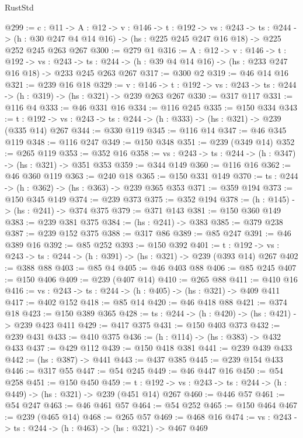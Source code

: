 \begin{lexlean}{RustStd}
\begin{coremodule}
{\begin{coremodule}
@299 := {c : @11} ->
  {A : @12} ->
  {v : @146} ->
  {t : @192} ->
  {vs : @243} ->
  {ts : @244} ->
  (h : @30 @247 @4 @14 @16) -> (hs : @225 @245 @247 @16 @18) -> @225 @252 @245 @263 @267
@300 := @279 @1
@316 := {A : @12} ->
  {v : @146} ->
  {t : @192} ->
  {vs : @243} ->
  {ts : @244} -> (h : @39 @4 @14 @16) -> (hs : @233 @247 @16 @18) -> @233 @245 @263 @267
@317 := @300 @2
@319 := @46 @14 @16
@321 := @239 @16 @18
@329 := {v : @146} ->
  {t : @192} -> {vs : @243} -> {ts : @244} -> (h : @319) -> (hs : @321) -> @239 @263 @267
@330 := @317 @117
@331 := @116 @4
@333 := @46 @331 @16
@334 := @116 @245
@335 := @150 @334
@343 := {t : @192} ->
  {vs : @243} -> {ts : @244} -> (h : @333) -> (hs : @321) -> @239 (@335 @14) @267
@344 := @330 @119
@345 := @116 @14
@347 := @46 @345 @119
@348 := @116 @247
@349 := @150 @348
@351 := @239 (@349 @14)
@352 := @265 @119
@353 := @352 @16
@358 := {vs : @243} -> {ts : @244} -> (h : @347) -> (hs : @321) -> @351 @353
@359 := @344 @149
@360 := @116 @16
@362 := @46 @360 @119
@363 := @240 @18
@365 := @150 @331 @149
@370 := {ts : @244} -> (h : @362) -> (hs : @363) -> @239 @365 @353
@371 := @359 @194
@373 := @150 @345 @149
@374 := @239 @373
@375 := @352 @194
@378 := (h : @145) -> (hs : @241) -> @374 @375
@379 := @371 @143
@381 := @150 @360 @149
@383 := @239 @381 @375
@384 := (hs : @241) -> @383
@385 := @379 @238
@387 := @239 @152 @375
@388 := @317 @86
@389 := @85 @247
@391 := @46 @389 @16
@392 := @85 @252
@393 := @150 @392
@401 := {t : @192} ->
  {vs : @243} -> {ts : @244} -> (h : @391) -> (hs : @321) -> @239 (@393 @14) @267
@402 := @388 @88
@403 := @85 @4
@405 := @46 @403 @88
@406 := @85 @245
@407 := @150 @406
@409 := @239 (@407 @14)
@410 := @265 @88
@411 := @410 @16
@416 := {vs : @243} -> {ts : @244} -> (h : @405) -> (hs : @321) -> @409 @411
@417 := @402 @152
@418 := @85 @14
@420 := @46 @418 @88
@421 := @374 @18
@423 := @150 @389 @365
@428 := {ts : @244} -> (h : @420) -> (hs : @421) -> @239 @423 @411
@429 := @417 @375
@431 := @150 @403 @373
@432 := @239 @431
@433 := @410 @375
@436 := (h : @114) -> (hs : @383) -> @432 @433
@437 := @429 @112
@439 := @150 @418 @381
@441 := @239 @439 @433
@442 := (hs : @387) -> @441
@443 := @437 @385
@445 := @239 @154 @433
@446 := @317 @55
@447 := @54 @245
@449 := @46 @447 @16
@450 := @54 @258
@451 := @150 @450
@459 := {t : @192} ->
  {vs : @243} -> {ts : @244} -> (h : @449) -> (hs : @321) -> @239 (@451 @14) @267
@460 := @446 @57
@461 := @54 @247
@463 := @46 @461 @57
@464 := @54 @252
@465 := @150 @464
@467 := @239 (@465 @14)
@468 := @265 @57
@469 := @468 @16
@474 := {vs : @243} -> {ts : @244} -> (h : @463) -> (hs : @321) -> @467 @469

\end{coremodule}}
\end{coremodule}
\end{lexlean}
